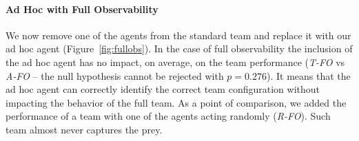 
\vspace{-0.3cm}
\paragraph{Ad Hoc with Full Observability}

We now remove one of the agents from the standard team and replace it with our ad hoc agent (Figure~\ref{fig:fullobs}). In the case of full observability the inclusion of the ad hoc agent has no impact, on average, on the team performance (\emph{T-FO} vs \emph{A-FO} -- the null hypothesis cannot be rejected with {\small$p=0.276$}). It means that the ad hoc agent can correctly identify the correct team configuration without impacting the behavior of the full team. As a point of comparison, we added the performance of a team with one of the agents acting randomly (\emph{R-FO}). Such team almost never captures the prey.

